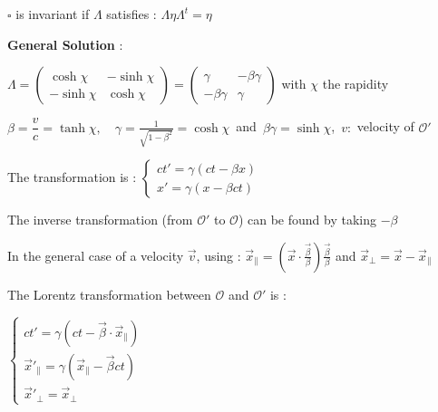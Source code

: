 \item $\square$ is invariant if $\Lambda$ satisfies : $\Lambda \eta \Lambda^t = \eta$ \\ 

\item[] \textbf{General Solution} : 
\item $ \Lambda = 
\begin{pmatrix}
\cosh \chi & -\sinh \chi \\
-\sinh \chi & \cosh \chi
\end{pmatrix}
= 
\begin{pmatrix}
    \gamma & -\beta\gamma \\
    -\beta\gamma & \gamma
\end{pmatrix}$ with $\chi$ the rapidity%

\item $\beta = \dfrac{v}{c} = \tanh \chi, \quad \gamma = \frac{1}{\sqrt{1-\beta^2}} = \cosh\chi \,$ and $\, \beta\gamma = \sinh\chi$, $\, v :$ velocity of $\mathcal{O}'$\\

\item  {The transformation is } : 
$\begin{cases}
ct' = \gamma (ct - \beta x) \\
x' = \gamma (x - \beta c t)
\end{cases}$

\item The inverse transformation (from $\mathcal{O}'$ to $\mathcal{O}$) can be found by taking $-\beta$

\item In the general case of a velocity $\vec{v}$, using : $\vec{x}_{\parallel} = \left( \vec{x} \cdot \frac{\vec{\beta}}{\beta} \right) \frac{\vec{\beta}}{\beta}$ and  $\vec{x}_{\perp} = \vec{x} - \vec{x}_{\parallel}$


\item The Lorentz transformation between $\mathcal{O}$ and $\mathcal{O}'$ is : 
\item $\begin{cases}
ct' = \gamma(ct- \vec{\beta} \cdot \vec{x}_\parallel) \\
\vec{x}'_{\parallel} = \gamma(\vec{x}_\parallel- \vec{\beta} c t)\\
\vec{x}'_{\perp} = \vec{x}_\perp
\end{cases}$
	
